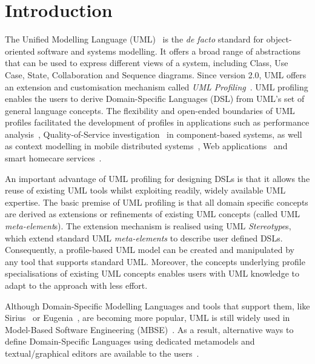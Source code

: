 \section{Introduction}
\label{sec:introduction}

The Unified Modelling Language (UML)~\cite{UML2015OMG} is the \emph{de facto} standard for object-oriented software and systems modelling. 
It offers a broad range of abstractions that can be used to express different views of a system, including Class, Use Case, State, Collaboration and Sequence diagrams. 
Since version 2.0, UML offers an extension and customisation mechanism called \emph{UML Profiling}~\cite{FuentesFernandez2004:UMLME}.
UML profiling enables the users to derive Domain-Specific Languages (DSL) from UML's set of general language concepts.
The flexibility and open-ended boundaries of UML profiles facilitated the development of profiles in applications such as performance analysis~\cite{xu2003performance}, Quality-of-Service investigation~\cite{cortellessa2004towards} in component-based systems, as well as context modelling in mobile distributed systems~\cite{Simons2007:JVLC}, Web applications~\cite{Moreno2007:IETS} and smart homecare services~\cite{Walderhaug2009:MODELS}. 

An important advantage of UML profiling for designing DSLs is that it allows the reuse of existing UML tools whilst exploiting readily, widely available UML expertise.
The basic premise of UML profiling is that all domain specific concepts are derived as extensions or refinements of existing UML concepts (called UML \textit{meta-element}s). 
The extension mechanism is realised using UML \textit{Stereotype}s, which extend standard UML \textit{meta-elements} to describe user defined DSLs. 
Consequently, a profile-based UML model can be created and manipulated by any tool that supports standard UML. 
Moreover, the concepts underlying profile specialisations of existing UML concepts enables users with UML knowledge to adapt to the approach with less effort.

Although Domain-Specific Modelling Languages and tools that support them, like Sirius~\cite{viyovic2014sirius}  or Eugenia~\cite{kolovos2015eugenia}, are becoming more popular, UML is still widely used in Model-Based Software Engineering (MBSE)~\cite{erickson2007theoretical}. 
As a result, alternative ways to define Domain-Specific Languages using dedicated metamodels and textual/graphical editors are available to the users~\cite{Bergmayr2014:MODELS,Pardillo2010:MODELS}. 

